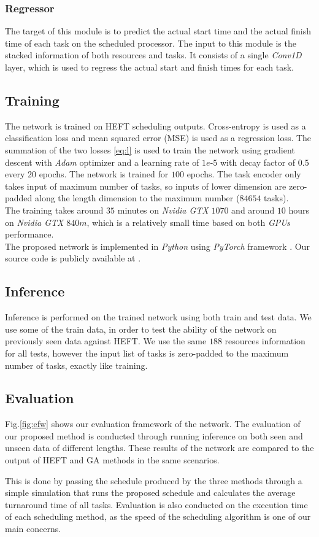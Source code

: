 \subsubsection{Regressor}
The target of this module is to predict the actual start time and the actual finish time of each task on the scheduled processor. The input to this module is the stacked information of both resources and tasks. It consists of a single \emph{Conv1D} layer, which is used to regress the actual start and finish times for each task. 

\subsection{Training}
The network is trained on HEFT scheduling outputs. Cross-entropy is used as a classification loss and mean squared error (MSE) is used as a regression loss. The summation of the two losses \ref{eq:l} is used to train the network using gradient descent with \emph{Adam} optimizer and a learning rate of $1e$-$5$ with decay factor of $0.5$ every 20 epochs. The network is trained for $100$ epochs. The task encoder only takes input of maximum number of tasks, so inputs of lower dimension are zero-padded along the length dimension to the maximum number ($84654$ tasks). \\

The training takes around $35$ minutes on \emph{Nvidia GTX} $1070$ and around $10$ hours on \emph{Nvidia GTX} $840m$, which is a relatively small time based on both \emph{GPUs} performance. \\

The proposed network is implemented in \emph{Python} using \emph{PyTorch} framework \cite{paszke2019pytorch}.  Our source code is publicly available at .

\subsection{Inference}
Inference is performed on the trained network using both train and test data. We use some of the train data, in order to test the ability of the network on previously seen data against HEFT. We use the same $188$ resources information for all tests, however the input list of tasks is zero-padded to the maximum number of tasks, exactly like training.

\subsection{Evaluation}
Fig.\ref{fig:efw} shows our evaluation framework of the network. The evaluation of our proposed method is conducted through running inference on both seen and unseen data of different lengths. These results of the network are compared to the output of HEFT and GA methods in the same scenarios. 

This is done by passing the schedule produced by the three methods through a simple simulation that runs the proposed schedule and calculates the average turnaround time of all tasks. Evaluation is also conducted on the execution time of each scheduling method, as the speed of the scheduling algorithm is one of our main concerns.